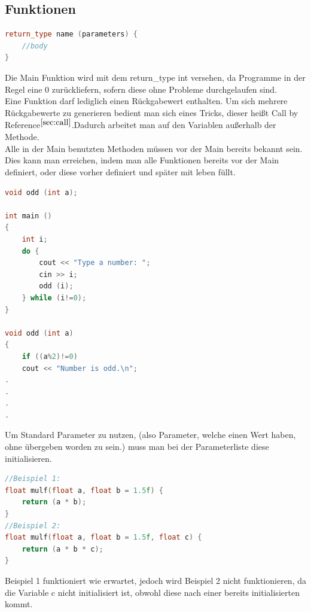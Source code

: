 \subsection{Funktionen}
\begin{lstlisting}[language=C++]
return_type name (parameters) {
	//body
}
\end{lstlisting}
Die Main Funktion wird mit dem return\_type int versehen, da Programme in der Regel eine 0 zurückliefern, sofern diese ohne Probleme durchgelaufen sind. \\
Eine Funktion darf lediglich einen Rückgabewert enthalten. Um sich mehrere Rückgabewerte zu generieren bedient man sich eines Tricks, dieser heißt Call by Reference$^{\ref{sec:call}}$.Dadurch arbeitet man auf den Variablen außerhalb der Methode.\\ 
Alle in der Main benutzten Methoden müssen vor der Main bereits bekannt sein. Dies kann man erreichen, indem man alle Funktionen bereits vor der Main definiert, oder diese vorher definiert und später mit leben füllt.\\
\begin{lstlisting}[language=C++]
void odd (int a);

int main ()
{
	int i;
	do {
		cout << "Type a number: ";
		cin >> i;
		odd (i);
	} while (i!=0);
}

void odd (int a)
{
	if ((a%2)!=0)
	cout << "Number is odd.\n";
.
.
.
.
\end{lstlisting}
Um Standard Parameter zu nutzen, (also Parameter, welche einen Wert haben, ohne übergeben worden zu sein.) muss man bei der Parameterliste diese initialisieren.
\begin{lstlisting}[language=C++]
//Beispiel 1:
float mulf(float a, float b = 1.5f) { 
	return (a * b); 
} 
//Beispiel 2:
float mulf(float a, float b = 1.5f, float c) { 
	return (a * b * c); 
} 
\end{lstlisting}
Beispiel 1 funktioniert wie erwartet, jedoch wird Beispiel 2 nicht funktionieren, da die Variable c nicht initialisiert ist, obwohl diese nach einer bereits initialisierten kommt. \\
